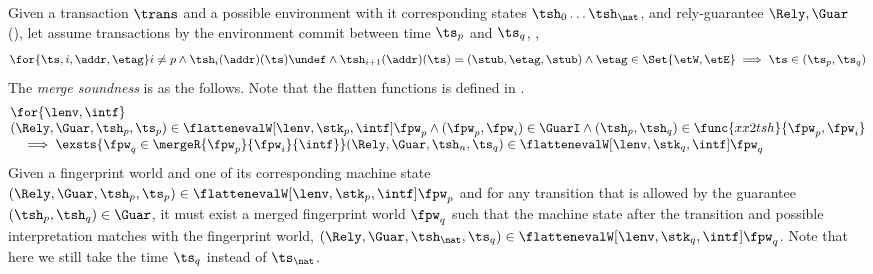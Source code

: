 \begin{lem}
\label{lem:merge-sound}
Given a transaction \( \trans \) and a possible environment with it corresponding states \( \tsh_{0} \dots \tsh_{\nat} \), and rely-guarantee \( \Rely, \Guar \) (), let assume transactions by the environment commit between time \( \ts_{p} \) and \( \ts_{q} \), \ie,
\[
    \for{\ts,i,\addr,\etag} 
    i \neq p 
    \land \tsh_{i}(\addr)(\ts)\undef 
    \land \tsh_{i + 1}(\addr)(\ts) = (\stub, \etag, \stub) 
    \land \etag \in \Set{\etW, \etE} 
    \implies \ts \in (\ts_{p}, \ts_{q})
\]
The \emph{merge soundness} is as the follows. 
Note that the flatten functions is defined in .
\[
\begin{array}{@{}l@{}}
    \for{ \lenv, \intf}  \\
    (\Rely, \Guar, \tsh_{p}, \ts_{p}) \in \flattenevalW[\lenv, \stk_{p}, \intf]{\fpw_{p}}
    \land (\fpw_{p}, \fpw_{i} ) \in \GuarI
    \land (\tsh_{p}, \tsh_{q}) \in \func{xx2tsh}{\fpw_{p}, \fpw_{i}} \\
    \quad \implies \exsts{\fpw_{q} \in \mergeR{\fpw_{p}}{\fpw_{i}}{\intf}}
    (\Rely, \Guar, \tsh_{n}, \ts_{q}) \in \flattenevalW[\lenv, \stk_{q}, \intf]{\fpw_{q}}
\end{array}
\]
Given a fingerprint world  and one of its corresponding machine state \( (\Rely, \Guar, \tsh_{p}, \ts_{p}) \in \flattenevalW[\lenv, \stk_{p}, \intf]{\fpw_{p}} \) and for any transition that is allowed by the guarantee \( (\tsh_{p}, \tsh_{q}) \in \Guar \), it must exist a merged fingerprint world \( \fpw_{q} \) such that the machine state after the transition and possible interpretation matches with the fingerprint world, \ie \((\Rely, \Guar, \tsh_{\nat}, \ts_{q}) \in \flattenevalW[\lenv, \stk_{q}, \intf]{\fpw_{q}}\).
Note that here we still take the time \( \ts_{q} \) instead of \( \ts_{\nat} \).
\end{lem}
